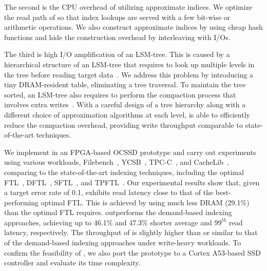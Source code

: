 The second is the CPU overhead of utilizing
approximate indices.
We optimize the read
path of \ours{} so that index lookups are served with a few bit-wise or
arithmetic operations.  
We also construct approximate indices by using cheap hash functions and hide the construction overhead by interleaving with I/Os.

The third is high I/O amplification
of an LSM-tree. This is caused by a hierarchical structure of an LSM-tree
that requires to look up multiple levels in the tree before reading target data~\cite{lsm-tree}. 
We address this problem by introducing a tiny DRAM-resident table,
eliminating a tree traversal. To maintain the tree
sorted, an LSM-tree also requires to perform the compaction process
that involves extra writes~\cite{lsm-tree}.
With a careful design of a tree hierarchy along with a different choice of approximation algorithms at each level, 
\ours{} is able to efficiently reduce the compaction overhead, providing 
write throughput comparable to state-of-the-art techniques.  

We implement \ours{} in an FPGA-based OCSSD prototype and 
carry out experiments using various workloads, Filebench~\cite{filebench}, 
YCSB~\cite{ycsb}, TPC-C~\cite{TPC-C}, and CacheLib~\cite{cachelib},
comparing
\ours{} to the state-of-the-art indexing techniques, including the optimal
FTL~\cite{flash-based-ssd}, DFTL~\cite{dftl}, SFTL~\cite{sftl}, and TPFTL~\cite{tpftl}.
Our experimental results show that, given a target error rate of 0.1, \ours{} exhibits read latency
close to that of the best-performing optimal FTL.
This is achieved 
by using much less DRAM (29.1\%) than the optimal FTL requires.  
\ours{} outperforms the demand-based indexing approaches, 
achieving up to 46.1\% and 47.3\%
shorter average and $99^{th}$ read latency, respectively.  The throughput of \ours{}
is slightly higher than or similar to that of the demand-based indexing approaches under write-heavy workloads. 
To confirm the feasibility of
\ours{}, we also port the \ours{} prototype to a Cortex
A53-based SSD controller and evaluate its time complexity.




